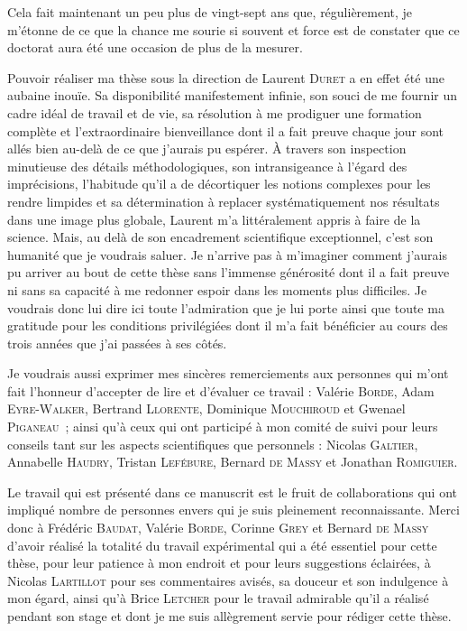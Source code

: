 Cela fait maintenant un peu plus de vingt-sept ans que, régulièrement, 
je m'étonne de ce que la chance me sourie si souvent et
force est de constater que ce doctorat aura été une occasion de plus de la mesurer.

Pouvoir réaliser ma thèse sous la direction de Laurent \textsc{Duret} a en effet été une aubaine inouïe.
Sa disponibilité manifestement infinie, son souci de me fournir un cadre idéal de travail et de vie, sa résolution à me prodiguer une formation complète et l'extraordinaire bienveillance dont il a fait preuve chaque jour sont allés bien au-delà de ce que j'aurais pu espérer.
\`A travers son inspection minutieuse des détails méthodologiques, son intransigeance à l'égard des imprécisions, l'habitude qu'il a de décortiquer les notions complexes pour les rendre limpides 
et sa détermination à replacer systématiquement nos résultats dans une image plus globale, Laurent m'a littéralement appris à faire de la science.
Mais, au delà de son encadrement scientifique exceptionnel, c'est son humanité que je voudrais saluer.
Je n'arrive pas à m'imaginer comment j'aurais pu arriver au bout de cette thèse sans l'immense générosité dont il a fait preuve ni sans sa capacité à me redonner espoir dans les moments plus difficiles.
Je voudrais donc lui dire ici toute l'admiration que je lui porte ainsi que toute ma gratitude pour les conditions privilégiées dont il m'a fait bénéficier au cours des trois années que j'ai passées à ses côtés.

Je voudrais aussi exprimer mes sincères remerciements aux personnes qui m'ont fait l'honneur d'accepter de lire et d'évaluer ce travail : Valérie \textsc{Borde}, Adam \textsc{Eyre-Walker}, Bertrand \textsc{Llorente}, Dominique \textsc{Mouchiroud} et Gwenael \textsc{Piganeau}~;
ainsi qu'à ceux qui ont participé à mon comité de suivi pour leurs conseils tant sur les aspects scientifiques que personnels : 
Nicolas \textsc{Galtier},
Annabelle \textsc{Haudry},
Tristan \textsc{Lefébure},
Bernard \textsc{de Massy} et
Jonathan \textsc{Romiguier}.


Le travail qui est présenté dans ce manuscrit est le fruit de collaborations qui ont impliqué nombre de personnes envers qui je suis pleinement reconnaissante.
Merci donc à Frédéric \textsc{Baudat}, Valérie \textsc{Borde}, Corinne \textsc{Grey} et Bernard \textsc{de Massy} d'avoir réalisé la totalité du travail expérimental qui a été essentiel pour cette thèse, pour leur patience à mon endroit et pour leurs suggestions éclairées,
à Nicolas \textsc{Lartillot} pour ses commentaires avisés, sa douceur et son indulgence à mon égard, ainsi qu'à Brice \textsc{Letcher} pour le travail admirable qu'il a réalisé pendant son stage et dont je me suis allègrement servie pour rédiger cette thèse.\\



